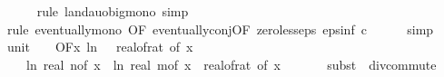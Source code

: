 \begin{isabellebody}
\ \ \ \ \isamarkupfalse%
\ {\isacharparenleft}{\kern0pt}rule\ landau{\isacharunderscore}{\kern0pt}o{\isachardot}{\kern0pt}big{\isacharunderscore}{\kern0pt}mono{\isacharcomma}{\kern0pt}\ simp{\isacharparenright}{\kern0pt}\isanewline
\ \ \ \ \isamarkupfalse%
\ {\isacharparenleft}{\kern0pt}rule\ eventually{\isacharunderscore}{\kern0pt}mono\ {\isacharbrackleft}{\kern0pt}OF\ eventually{\isacharunderscore}{\kern0pt}conj{\isacharbrackleft}{\kern0pt}OF\ zero{\isacharunderscore}{\kern0pt}less{\isacharunderscore}{\kern0pt}eps\ eps{\isacharunderscore}{\kern0pt}inf{\isacharbrackleft}{\kern0pt}\ c{\isacharequal}{\kern0pt}{\isachardoublequoteopen}{}{\isachardoublequoteclose}{\isacharbrackright}{\kern0pt}{\isacharbrackright}{\kern0pt}{\isacharbrackright}{\kern0pt}{\isacharparenright}{\kern0pt}\isanewline
\ \ \ \ \isamarkupfalse%
\ simp\isanewline
\isanewline
\ \ \isamarkupfalse%
\ unit{\isacharunderscore}{\kern0pt}{}{\isacharcolon}{\kern0pt}\ {\isachardoublequoteopen}{\isacharparenleft}{\kern0pt}{\isasymlambda}{\isacharunderscore}{\kern0pt}{\isachardot}{\kern0pt}\ {}{\isacharparenright}{\kern0pt}\ {\isasymin}\ O{\isacharbrackleft}{\kern0pt}{\isacharquery}{\kern0pt}F{\isacharbrackright}{\kern0pt}{\isacharparenleft}{\kern0pt}{\isasymlambda}x{\isachardot}{\kern0pt}\ ln\ {\isacharparenleft}{\kern0pt}{}\ {\isacharslash}{\kern0pt}\ real{\isacharunderscore}{\kern0pt}of{\isacharunderscore}{\kern0pt}rat\ {\isacharparenleft}{\kern0pt}{\isasymepsilon}{\isacharunderscore}{\kern0pt}of\ x{\isacharparenright}{\kern0pt}{\isacharparenright}{\kern0pt}\ {\isacharasterisk}{\kern0pt}\isanewline
\ \ \ \ {\isacharparenleft}{\kern0pt}ln\ {\isacharparenleft}{\kern0pt}real\ {\isacharparenleft}{\kern0pt}n{\isacharunderscore}{\kern0pt}of\ x{\isacharparenright}{\kern0pt}{\isacharparenright}{\kern0pt}\ {\isacharplus}{\kern0pt}\ ln\ {\isacharparenleft}{\kern0pt}real\ {\isacharparenleft}{\kern0pt}m{\isacharunderscore}{\kern0pt}of\ x{\isacharparenright}{\kern0pt}{\isacharparenright}{\kern0pt}{\isacharparenright}{\kern0pt}\ {\isacharslash}{\kern0pt}\ {\isacharparenleft}{\kern0pt}real{\isacharunderscore}{\kern0pt}of{\isacharunderscore}{\kern0pt}rat\ {\isacharparenleft}{\kern0pt}{\isasymdelta}{\isacharunderscore}{\kern0pt}of\ x{\isacharparenright}{\kern0pt}{\isacharparenright}{\kern0pt}\ \isanewline
\ \ \ \ \isamarkupfalse%
\ {\isacharparenleft}{\kern0pt}subst\ {\isacharparenleft}{\kern0pt}{}{\isacharparenright}{\kern0pt}\ div{\isacharunderscore}{\kern0pt}commute{\isacharparenright}{\kern0pt}\isanewline

\end{isabellebody}
